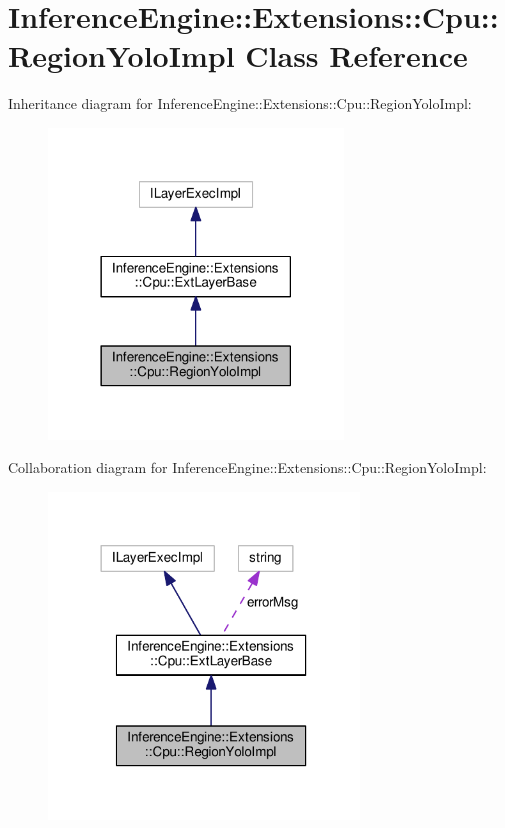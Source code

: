 \hypertarget{classInferenceEngine_1_1Extensions_1_1Cpu_1_1RegionYoloImpl}{}\section{Inference\+Engine\+:\+:Extensions\+:\+:Cpu\+:\+:Region\+Yolo\+Impl Class Reference}
\label{classInferenceEngine_1_1Extensions_1_1Cpu_1_1RegionYoloImpl}


Inheritance diagram for Inference\+Engine\+:\+:Extensions\+:\+:Cpu\+:\+:Region\+Yolo\+Impl\+:
\nopagebreak
\begin{figure}[H]
\begin{center}
\leavevmode
\includegraphics[width=222pt]{classInferenceEngine_1_1Extensions_1_1Cpu_1_1RegionYoloImpl__inherit__graph}
\end{center}
\end{figure}


Collaboration diagram for Inference\+Engine\+:\+:Extensions\+:\+:Cpu\+:\+:Region\+Yolo\+Impl\+:
\nopagebreak
\begin{figure}[H]
\begin{center}
\leavevmode
\includegraphics[width=234pt]{classInferenceEngine_1_1Extensions_1_1Cpu_1_1RegionYoloImpl__coll__graph}
\end{center}
\end{figure}
